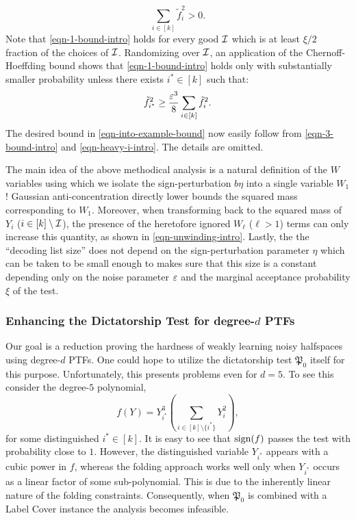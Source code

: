 \begin{equation}
\sum_{i \in [k]}\tilde{f}_{i}^2 > 0. 
\label{eqn-3-bound-intro}
\end{equation}
Note that   \eqref{eqn-1-bound-intro} holds for every good
$\mathcal{I}$ which is at least $\xi/2$ fraction of the choices of
$\mathcal{I}$. Randomizing over $\mathcal{I}$, an application of the Chernoff-Hoeffding
bound shows that \eqref{eqn-1-bound-intro} holds only with substantially smaller
probability unless there exists $i^* \in [k]$ such that:
\begin{equation}
\tilde{f}_{i^*}^2 \geq \frac{\varepsilon^3}{8}\sum_{i \in
[k]}\tilde{f}_{i}^2. \label{eqn-heavy-i-intro}
\end{equation}
The desired bound in   \eqref{eqn-into-example-bound} now easily follow
from \eqref{eqn-3-bound-intro} and
\eqref{eqn-heavy-i-intro}.
The details are omitted.

The main idea of the above 
methodical analysis is a natural definition of the $W$
variables using which we isolate the sign-perturbation $b\eta$ into a
single variable $W_1$! Gaussian anti-concentration directly lower bounds 
the squared mass corresponding to $W_1$. Moreover, when transforming back 
to the squared mass of $Y_{i}$ ($i \in [k]\setminus\mathcal{I}$), the presence
of the heretofore ignored $W_{\ell}$ ($\ell > 1$) terms can only increase this quantity, as shown
in \eqref{eqn-unwinding-intro}. Lastly, the 
the ``decoding list size''  does not depend on the
sign-perturbation parameter $\eta$ which can be taken to
be small enough to makes sure that this size is a constant
depending only on the noise parameter $\varepsilon$ and
the marginal acceptance probability $\xi$ of the test.



\subsubsection{Enhancing the Dictatorship Test for degree-$d$ PTFs}


Our goal is a reduction proving the hardness of weakly
learning noisy halfspaces using degree-$d$ PTFs. One could hope
to utilize the dictatorship test $\mathfrak{P}_0$ itself for this purpose.
Unfortunately, this presents problems even for $d = 5$. To see this
consider  
the
degree-$5$ polynomial,
$$f(Y) = Y_{i^*}^3\left(\sum_{i\in[k]\setminus\{i^*\}}Y^2_i\right),$$
for some distinguished $i^* \in [k]$.
It is easy to see that $\textnormal{sign}(f)$ passes the test with probability close to
$1$. However, the distinguished variable $Y_{i^*}$ appears with a cubic
power in $f$, whereas the folding approach works well only when $Y_{i^*}$
occurs as a linear factor of some sub-polynomial. This is due to the inherently
linear nature of the folding constraints. Consequently, 
when $\mathfrak{P}_0$ is combined with a Label Cover
instance the analysis becomes infeasible. 

